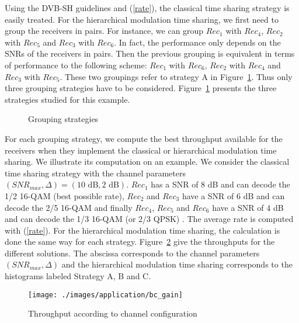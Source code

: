 \documentclass[conference, letterpaper]{IEEEtran}
\begin{document}
Using the DVB-SH guidelines \cite{sh} and (\ref{rate}), the classical time sharing strategy is easily treated. For the hierarchical modulation time sharing, we first need to group the receivers in pairs. For instance, we can group  $Rec_1$ with $Rec_4$, $Rec_2$ with $Rec_5$ and $Rec_3$ with $Rec_6$. In fact, the performance only depends on the SNRs of the receivers in pairs. Then the previous grouping is equivalent in terms of performance to the following scheme: $Rec_1$ with $Rec_6$, $Rec_2$ with $Rec_4$ and $Rec_3$ with $Rec_5$. These two groupings refer to strategy A in Figure~\ref{grouping_strategies}. Thus only three grouping strategies have to be considered. Figure~\ref{grouping_strategies} presents the three strategies studied for this example. 
\begin{figure}[!ht]
\centerline{
\hfil
{}
\hfil
{}
}\caption{Grouping strategies}
\label{grouping_strategies}
\end{figure}

For each grouping strategy, we compute the best throughput available for the receivers when they implement the classical or hierarchical modulation time sharing. We illustrate its computation on an example. We consider the classical time sharing strategy with the channel parameters $(SNR_{max},\Delta)=(10\text{ dB},2\text{ dB})$. $Rec_1$ has a SNR of 8 dB and can decode the 1/2 16-QAM (best possible rate), $Rec_2$ and $Rec_3$ have a SNR of 6 dB and can decode the 2/5 16-QAM and finally $Rec_4$, $Rec_5$ and $Rec_6$ have a SNR of 4 dB and can decode the 1/3 16-QAM (or 2/3 QPSK) \cite{sh}. The average rate is computed with (\ref{rate}). For the hierarchical modulation time sharing, the calculation is done the same way for each strategy. Figure~\ref{throughput_bc} give the throughputs for the different solutions. The abscissa corresponds to the channel parameters $(SNR_{max},\Delta)$ and the hierarchical modulation time sharing corresponds to the histograms labeled Strategy A, B and C.

\begin{figure}[!ht]
\centering
\texttt{[image: ./images/application/bc\_gain]}
\caption{Throughput according to channel configuration}
\label{throughput_bc}
\end{figure}
\end{document}

